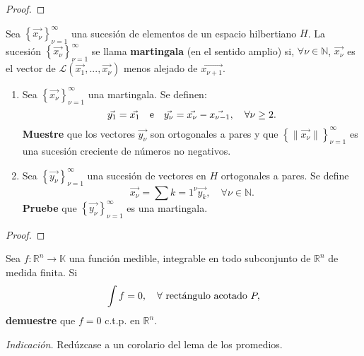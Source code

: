 \documentclass[12pt]{report}
\theoremstyle{largebreak}
\newcommand\cf[3]{\ensuremath{#1:#2\rightarrow#3}}
\newcommand\norm[1]{\ensuremath{\|#1\|}}
\begin{document}
    \begin{proof}
        
    \end{proof}

    \begin{excer}
        Sea $\left\{\vec{x_\nu} \right\}_{\nu=1}^\infty$ una sucesión de elementos de un espacio hilbertiano $H$. La sucesión $\left\{\vec{x_\nu} \right\}_{\nu=1}^\infty$ se llama \textbf{martingala} (en el sentido amplio) si, $\forall\nu\in\mathbb{N}$, $\vec{x_\nu}$ es el vector de $\mathcal{L}(\vec{x_1},...,\vec{x_\nu})$ menos alejado de $\vec{x_{\nu+1}}$.
        \begin{enumerate}
            \item Sea $\left\{\vec{x_\nu} \right\}_{\nu=1}^\infty$ una martingala. Se definen:
            \begin{equation*}
                \vec{y_1}=\vec{x_1}\quad\textup{e}\quad\vec{y_\nu}=\vec{x_\nu}-\vec{x_{\nu-1}},\quad\forall\nu\geq2.
            \end{equation*}
            \textbf{Muestre} que los vectores $\vec{y_\nu}$ son ortogonales a pares y que $\left\{\norm{\vec{x_\nu}} \right\}_{\nu=1}^\infty$ es una sucesión creciente de números no negativos.
            \item Sea $\left\{\vec{y_\nu} \right\}_{\nu=1}^\infty$ una sucesión de vectores en $H$ ortogonales a pares. Se define
            \begin{equation*}
                \vec{x_\nu}=\sum{k=1}^\nu\vec{y_k},\quad\forall\nu\in\mathbb{N}.
            \end{equation*}
            \textbf{Pruebe} que $\left\{\vec{y_\nu} \right\}_{\nu=1}^\infty$ es una martingala.
        \end{enumerate}
    \end{excer}

    \begin{proof}
        
    \end{proof}

    \begin{excer}
        Sea $\cf{f}{\mathbb{R}^n}{\mathbb{K}}$ una función medible, integrable en todo subconjunto de $\mathbb{R}^n$ de medida finita. Si
        \begin{equation*}
            \int f=0,\quad\forall\textup{ rectángulo acotado }P,
        \end{equation*}
        \textbf{demuestre} que $f=0$ c.t.p. en $\mathbb{R}^n$.
        
        \textit{Indicación.} Redúzcase a un corolario del lema de los promedios.
    \end{excer}
\end{document}
